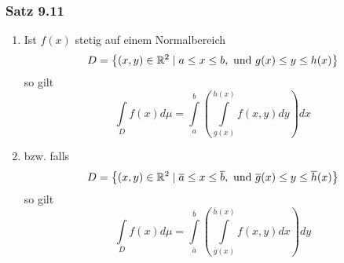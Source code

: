 \subsubsection*{Satz 9.11}
\begin{enumerate}
\item Ist $f(x)$ stetig auf einem Normalbereich \[D=\left\{ \left( x,y\right)\in\mathbb{R}^2\mid a\leq x\leq b,\text{ und }g(x)\leq y\leq h(x)\right\}\]
so gilt
\[\int\limits_D {f(x)d\mu  = \int\limits_a^b {\left( {\int\limits_{g(x)}^{h(x)} {f\left( {x,y} \right)dy} } \right)dx} } \]
\item bzw. falls \[D=\left\{ \left( x,y\right)\in\mathbb{R}^2\mid \overline{a}\leq x\leq \overline{b},\text{ und }\overline{g}(x)\leq y\leq \overline{h}(x)\right\}\]
so gilt
\[\int\limits_D {f(x)d\mu  = \int\limits_{\overline{a}}^{\overline{b}} {\left( {\int\limits_{\overline{g}(x)}^{\overline{h}(x)} {f\left( {x,y} \right)dx} } \right)dy} } \]
\end{enumerate}
